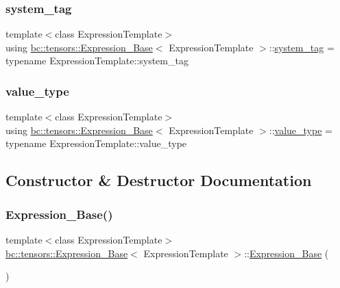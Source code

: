 \subsubsection{\texorpdfstring{system\+\_\+tag}{system\_tag}}
{\footnotesize\ttfamily template$<$class Expression\+Template$>$ \\
using \hyperlink{classbc_1_1tensors_1_1Expression__Base}{bc\+::tensors\+::\+Expression\+\_\+\+Base}$<$ Expression\+Template $>$\+::\hyperlink{classbc_1_1tensors_1_1Expression__Base_a7c54328db22f61f881e7607b5a69b8e5}{system\+\_\+tag} =  typename Expression\+Template\+::system\+\_\+tag}

\mbox{\label{classbc_1_1tensors_1_1Expression__Base_acda5b4e228c9b3cb9174258d5caf860a}} 
\subsubsection{\texorpdfstring{value\+\_\+type}{value\_type}}
{\footnotesize\ttfamily template$<$class Expression\+Template$>$ \\
using \hyperlink{classbc_1_1tensors_1_1Expression__Base}{bc\+::tensors\+::\+Expression\+\_\+\+Base}$<$ Expression\+Template $>$\+::\hyperlink{classbc_1_1tensors_1_1Expression__Base_acda5b4e228c9b3cb9174258d5caf860a}{value\+\_\+type} =  typename Expression\+Template\+::value\+\_\+type}



\subsection{Constructor \& Destructor Documentation}
\mbox{\label{classbc_1_1tensors_1_1Expression__Base_aa0eeffb8b5d42ef4cdaee3e1bf9a9041}} 
\subsubsection{\texorpdfstring{Expression\+\_\+\+Base()}{Expression\_Base()}\hspace{0.1cm}{\footnotesize\ttfamily [1/3]}}
{\footnotesize\ttfamily template$<$class Expression\+Template$>$ \\
\hyperlink{classbc_1_1tensors_1_1Expression__Base}{bc\+::tensors\+::\+Expression\+\_\+\+Base}$<$ Expression\+Template $>$\+::\hyperlink{classbc_1_1tensors_1_1Expression__Base}{Expression\+\_\+\+Base} (\begin{DoxyParamCaption}{ }\end{DoxyParamCaption})\hspace{0.3cm}{\ttfamily [inline]}}

